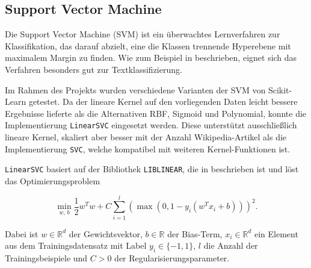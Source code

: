 \subsection{Support Vector Machine}
\label{SVM}

Die Support Vector Machine (SVM) ist ein überwachtes Lernverfahren zur Klassifikation, das darauf abzielt, eine die Klassen trennende Hyperebene mit maximalem Margin zu finden. Wie zum Beispiel in \cite{Joachims1998} beschrieben, eignet sich das Verfahren besonders gut zur Textklassifizierung.

Im Rahmen des Projekts wurden verschiedene Varianten der SVM von Scikit-Learn \cite{Pedregosa2011} getestet. Da der lineare Kernel auf den vorliegenden Daten leicht bessere Ergebnisse lieferte als die Alternativen RBF, Sigmoid und Polynomial, konnte die Implementierung \texttt{LinearSVC} eingesetzt werden. Diese unterstützt ausschließlich lineare Kernel, skaliert aber besser mit der Anzahl Wikipedia-Artikel als die Implementierung \texttt{SVC}, welche kompatibel mit weiteren Kernel-Funktionen ist.

\texttt{LinearSVC} basiert auf der Bibliothek \texttt{LIBLINEAR}, die in \cite{Fan2008} beschrieben ist und löst das Optimierungsproblem

\begin{equation*}
  \min_{w,\, b} \frac{1}{2} w^T w + C \sum_{i=1}^{l} \left( \max(0, 1 - y_i (w^T x_i + b)) \right)^2.
\end{equation*}

Dabei ist \( w \in \mathbb{R}^d \) der Gewichtsvektor, \( b \in \mathbb{R} \) der Bias-Term, \( x_i \in \mathbb{R}^d \) ein Element aus dem Trainingsdatensatz mit Label \( y_i \in \{-1, 1\} \), \( l \) die Anzahl der Trainingsbeispiele und \( C > 0 \) der Regularisierungsparameter.


